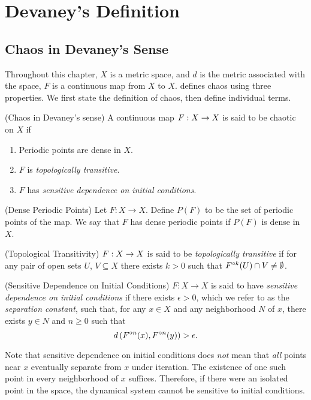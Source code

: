 \documentclass[12pt,draft,twoside]{book}
\begin{document}
\chapter{Devaney's Definition}
\label{chap:devaney}
\section{Chaos in Devaney's Sense}
Throughout this chapter, $X$ is a metric space, and $d$ is the metric associated with the space, $F$ is a continuous map from $X$ to $X$.
\citet{devaney} defines chaos using three properties.
We first state the definition of chaos, then define individual terms.
\begin{definition}
  (Chaos in Devaney's sense) 
  A continuous map $F: X\rightarrow X$ is said to be chaotic on $X$ if
  \begin{enumerate}
    \item Periodic points are dense in $X$.
    \item $F$ is \textit{topologically transitive}.
    \item $F$ has \textit{sensitive dependence on initial conditions}.
  \end{enumerate}
\end{definition}
%
\begin{definition}
  (Dense Periodic Points) 
  Let $F: X \to X$.
  Define $P(F)$ to be the set of periodic points of the map.
  We say that $F$ has dense periodic points if $P(F)$ is dense in $X$.
\end{definition}
%
\begin{definition}
  (Topological Transitivity) 
  $F: X \rightarrow X$ is said to be \textit{topologically transitive} if for any pair of open sets $U$, $V \subseteq X$ there exists $k > 0$ such that $F^{\circ k}(U) \cap V \neq \emptyset$.
  \label{defn:transitivity}
\end{definition}
%
\begin{definition}
  (Sensitive Dependence on Initial Conditions) 
  $F: X \rightarrow X$ is said to have \textit{sensitive dependence on initial conditions} if there exists $\epsilon > 0$, which we refer to as the \textit{separation constant}, such that, for any $x \in X$ and any neighborhood $N$ of $x$, there exists $y\in N$ and $n\geq 0$ such that 
  \begin{equation*}
    d\left( F^{\circ n}(x), F^{\circ n}(y) \right) > \epsilon.
  \end{equation*}
  \label{defn:sdic}
\end{definition}
%
\begin{remark}
  Note that sensitive dependence on initial conditions does \textit{not} mean that \textit{all} points near $x$ eventually separate from $x$ under iteration.
The existence of one such point in every neighborhood of $x$ suffices.
Therefore, if there were an isolated point in the space, the dynamical system cannot be sensitive to initial conditions.
\end{remark}
\end{document}
